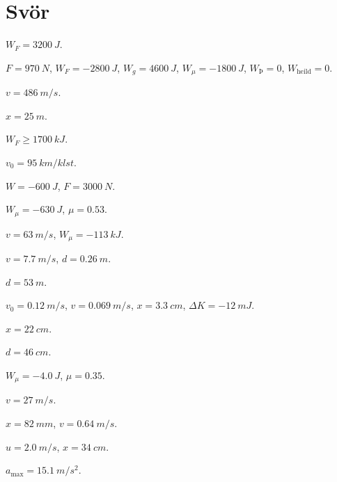 \section*{Svör}

\begin{enumerate*}[label = \vspace{0.15cm} \textbf{(\arabic*)}]
  \item $W_F = \SI{3200}{J}$.
  \item $F = \SI{970}{N}$, $W_F = \SI{-2800}{J}$, $W_g = \SI{4600}{J}$, $W_\mu = \SI{-1800}{J}$, $W_\text{Þ} = 0$, $W_{\text{heild}} = 0$.
  \item $v = \SI{486}{m/s}$.
  \item $x = \SI{25}{m}$.
  \item $W_F \geq \SI{1700}{kJ}$.
  \item $v_0 = \SI{95}{km/klst}$.
  \item $W = -\SI{600}{J}$, $F = \SI{3000}{N}$.
  \item $W_\mu = -\SI{630}{J}$, $\mu = 0.53$.
  \item $v = \SI{63}{m/s}$, $W_\mu = -\SI{113}{kJ}$.
  \item $v = \SI{7.7}{m/s}$, $d = \SI{0.26}{m}$.
  \item $d = \SI{53}{m}$.
  \item $v_0 = \SI{0.12}{m/s}$, $v = \SI{0.069}{m/s}$, $x = \SI{3.3}{cm}$, $\Delta K = -\SI{12}{mJ}$.
  \item $x = \SI{22}{cm}$.
  \item $d = \SI{46}{cm}$.
  \item $W_\mu = -\SI{4.0}{J}$, $\mu = 0.35$.
  \item $v = \SI{27}{m/s}$.
  \item $x = \SI{82}{mm}$, $v = \SI{0.64}{m/s}$.
  \item $u = \SI{2.0}{m/s}$, $x = \SI{34}{cm}$.
  \item $a_{\text{max}} = \SI{15.1}{m/s^2}$.
\end{enumerate*}

\newpage